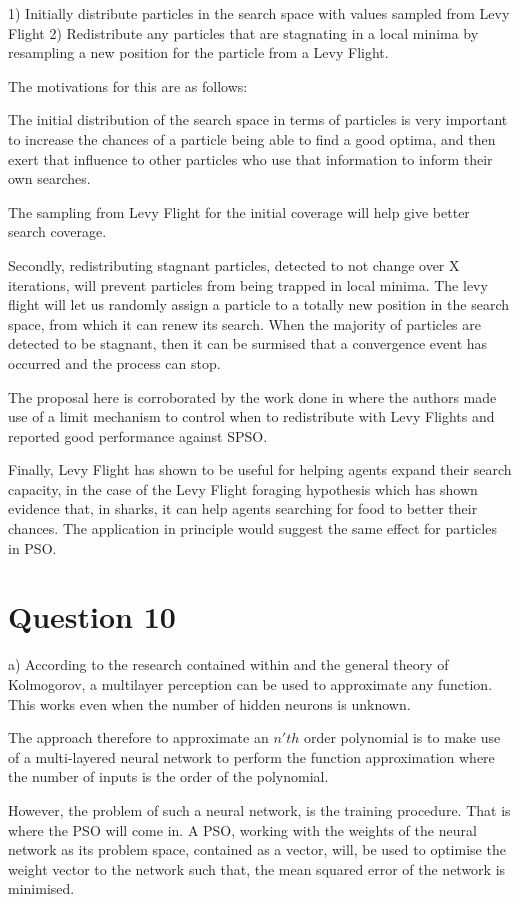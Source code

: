 \documentclass[12pt]{article}
\begin{document}
1) Initially distribute particles in the search space with values sampled from Levy Flight
2) Redistribute any particles that are stagnating in a local minima by resampling a new position for the particle from a Levy Flight.

The motivations for this are as follows:

The initial distribution of the search space in terms of particles is very important to increase the chances of a particle being able to find a good optima, and then exert that influence to other particles who use that information to inform their own searches. 

The sampling from Levy Flight for the initial coverage will help give better search coverage.

Secondly, redistributing stagnant particles, detected to not change over X iterations, will prevent particles from being trapped in local minima. The levy flight will let us randomly assign a particle to a totally new position in the search space, from which it can renew its search. When the majority of particles are detected to be stagnant, then it can be surmised that a convergence event has occurred and the process can stop.

The proposal here is corroborated by the work done in \cite{Haklı2014333} where the authors made use of a limit mechanism to control when to redistribute with Levy Flights and reported good performance against SPSO.

Finally, Levy Flight has shown to be useful for helping agents expand their search capacity, in the case of the Levy Flight foraging hypothesis
\cite{humphries_2010} which has shown evidence that, in sharks, it can help agents searching for food to better their chances. The application in principle would suggest the same effect for particles in PSO.
\section{Question 10}
a) According to the research contained within \cite{Kůrková1992501} and the general theory of Kolmogorov, a multilayer perception can be used to approximate any function. This works even when the number of hidden neurons is unknown. 

The approach therefore to approximate an $n'th$ order polynomial is to make use of a multi-layered neural network to perform the function approximation where the number of inputs is the order of the polynomial. 

However, the problem of such a neural network, is the training procedure. That is where the PSO will come in. A PSO, working with the weights of the neural network as its problem space, contained as a vector, will, be used to optimise the weight vector to the network such that, the mean squared error of the network is minimised. 
\end{document}
